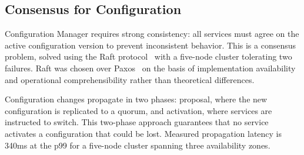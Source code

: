 \subsection{Consensus for Configuration}

Configuration Manager requires strong consistency: all services must agree on the active configuration version to prevent inconsistent behavior. This is a consensus problem, solved using the Raft protocol~\cite{ongaro-raft-2014} with a five-node cluster tolerating two failures. Raft was chosen over Paxos~\cite{chandra-paxos-1996} on the basis of implementation availability and operational comprehensibility rather than theoretical differences.

Configuration changes propagate in two phases: proposal, where the new configuration is replicated to a quorum, and activation, where services are instructed to switch. This two-phase approach guarantees that no service activates a configuration that could be lost. Measured propagation latency is 340ms at the p99 for a five-node cluster spanning three availability zones.
